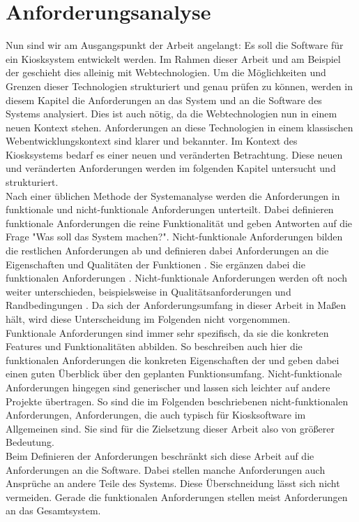 \chapter{Anforderungsanalyse}
\label{chap:anforderungen}

Nun sind wir am Ausgangspunkt der Arbeit angelangt: Es soll die Software für ein Kiosksystem
entwickelt werden. Im Rahmen dieser Arbeit und am Beispiel der \shst{}
geschieht dies alleinig mit Webtechnologien. Um die Möglichkeiten und Grenzen dieser Technologien
strukturiert und genau prüfen zu können, werden in diesem Kapitel die Anforderungen an das System
und an die Software des Systems analysiert.
Dies ist auch nötig, da die Webtechnologien nun in einem neuen Kontext stehen. Anforderungen an diese
Technologien in einem klassischen Webentwicklungskontext sind klarer und bekannter. Im Kontext
des Kiosksystems bedarf es einer neuen und veränderten Betrachtung. 
Diese neuen und veränderten Anforderungen werden im folgenden Kapitel untersucht und strukturiert.\\

Nach einer üblichen Methode der Systemanalyse werden die Anforderungen in funktionale und 
nicht-funktionale Anforderungen unterteilt. Dabei definieren funktionale Anforderungen die 
reine Funktionalität und geben Antworten 
auf die Frage "Was soll das System machen?". Nicht-funktionale Anforderungen bilden die
restlichen Anforderungen ab und definieren dabei Anforderungen an die Eigenschaften und Qualitäten der
Funktionen \cite[S.20 f.]{systemanalyse}. Sie ergänzen dabei die funktionalen 
Anforderungen \cite{systematisches}. Nicht-funktionale Anforderungen werden oft noch weiter unterschieden,
beispielsweise in Qualitätsanforderungen und Randbedingungen \cite{systemanalyse,systematisches}.
Da sich der Anforderungsumfang in dieser Arbeit in Maßen hält, wird diese Unterscheidung im Folgenden
nicht vorgenommen.\\
Funktionale Anforderungen sind immer sehr spezifisch, da sie die konkreten Features
und Funktionalitäten abbilden. So beschreiben auch hier die funktionalen Anforderungen die konkreten
Eigenschaften der \shst{} und geben dabei einen guten Überblick über den geplanten Funktionsumfang.
Nicht-funktionale Anforderungen hingegen sind generischer und lassen sich leichter auf andere Projekte
übertragen. So sind die im Folgenden beschriebenen nicht-funktionalen Anforderungen, Anforderungen, die
auch typisch für Kiosksoftware im Allgemeinen sind. Sie sind für die Zielsetzung dieser Arbeit also von 
größerer Bedeutung.\\
Beim Definieren der Anforderungen beschränkt sich diese Arbeit auf die Anforderungen an die Software.
Dabei stellen manche Anforderungen auch Ansprüche an andere Teile des Systems. Diese Überschneidung
lässt sich nicht vermeiden. Gerade die funktionalen Anforderungen stellen meist Anforderungen an das 
Gesamtsystem.\\ 


